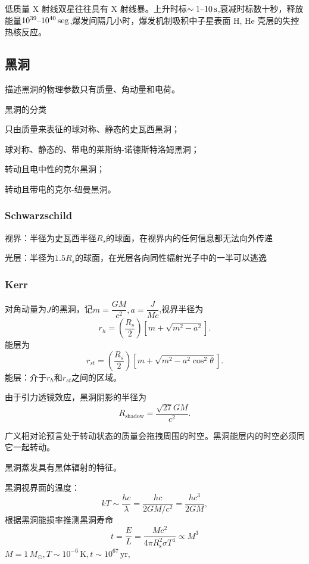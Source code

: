 \documentclass[../天体物理基础.tex]{subfiles}
\begin{document}
低质量 X 射线双星往往具有 X 射线暴。上升时标$\sim1\text{\textendash}10\,\mathrm{s}$,衰减时标数十秒，释放能量$10^{39}\text{\textendash}10^{40}\,\mathrm{seg}$,爆发间隔几小时，爆发机制吸积中子星表面 H, He 壳层的失控热核反应。

\subsection{黑洞}
描述黑洞的物理参数只有质量、角动量和电荷。

黑洞的分类

只由质量来表征的球对称、静态的史瓦西黑洞；

球对称、静态的、带电的莱斯纳{}-{}诺德斯特洛姆黑洞；

转动且电中性的克尔黑洞；

转动且带电的克尔{}-{}纽曼黑洞。

\subsubsection{Schwarzschild}
视界：半径为史瓦西半径$R_s$的球面，在视界内的任何信息都无法向外传递

光层：半径为$1.5R_s$的球面，在光层各向同性辐射光子中的一半可以逃逸

\subsubsection{Kerr}
对角动量为$J$的黑洞，记$m=\dfrac{GM}{c^{2}},a=\dfrac{J}{Mc}$,视界半径为
\begin{equation}
r_{h}=(\frac{R_{s}}{2})[m+\sqrt{m^{2}-a^{2}}].
\end{equation}
能层为
\begin{equation}
r_{st}=(\frac{R_{s}}2)[m+\sqrt{m^{2}-a^{2}\cos^{2}\theta}].
\end{equation}
能层：介于$r_{h}$和$r_{st}$之间的区域。

由于引力透镜效应，黑洞阴影的半径为
\begin{equation}
R_{\text{shadow}}=\frac{\sqrt{27}GM}{c^{2}}.
\end{equation}

广义相对论预言处于转动状态的质量会拖拽周围的时空。黑洞能层内的时空必须同它一起转动。

黑洞蒸发具有黑体辐射的特征。

黑洞视界面的温度：
\begin{equation}
kT\sim\frac{hc}{\lambda}=\frac{hc}{2GM/c^{2}}=\frac{hc^{3}}{2GM},
\end{equation}
根据黑洞能损率推测黑洞寿命
\begin{equation}
t=\frac{E}{L}=\frac{Mc^{2}}{4\pi R_{\text{s}}^{2}\sigma T^{4}}\propto{}M^{3}
\end{equation}
$M=1\,M_{\odot},T\sim10^{-6}\,\mathrm{K},t\sim10^{67}\,\mathrm{yr}$,
\end{document}
